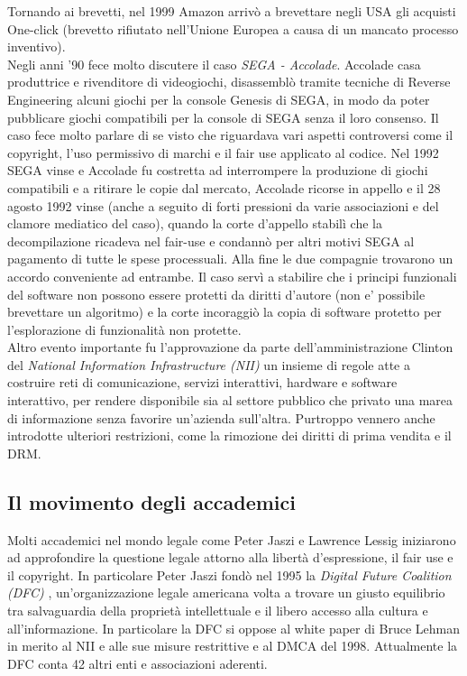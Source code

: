 Tornando ai brevetti, nel 1999 Amazon arrivò a brevettare negli USA gli acquisti One-click (brevetto rifiutato nell'Unione Europea a causa di un mancato processo inventivo).\\

Negli anni '90 fece molto discutere il caso \textit{SEGA - Accolade}. Accolade casa produttrice e rivenditore di videogiochi, disassemblò tramite tecniche di Reverse Engineering alcuni giochi per la console Genesis di SEGA, in modo da poter pubblicare giochi compatibili per la console di SEGA senza il loro consenso. Il caso fece molto parlare di se visto che riguardava vari aspetti controversi come il copyright, l'uso permissivo di marchi e il fair use applicato al codice.
Nel 1992 SEGA vinse e Accolade fu costretta ad interrompere la produzione di giochi compatibili e a ritirare le copie dal mercato, Accolade ricorse in appello e il 28 agosto 1992 vinse (anche a seguito di forti pressioni da varie associazioni e del clamore mediatico del caso), quando la corte d'appello stabilì che la decompilazione ricadeva nel fair-use e condannò per altri motivi SEGA al pagamento di tutte le spese processuali. Alla fine le due compagnie trovarono un accordo conveniente ad entrambe. Il caso servì a stabilire che i principi funzionali del software non possono essere protetti da diritti d'autore (non e' possibile brevettare un algoritmo) e la corte incoraggiò la copia di software protetto per l'esplorazione di funzionalità non protette.\\

Altro evento importante fu l'approvazione da parte dell'amministrazione Clinton del \textit{National Information Infrastructure (NII)} un insieme di regole atte a costruire reti di comunicazione, servizi interattivi, hardware e software interattivo, per rendere disponibile sia al settore pubblico che privato una marea di informazione senza favorire un'azienda sull'altra. Purtroppo vennero anche introdotte ulteriori restrizioni, come la rimozione dei diritti di prima vendita e il DRM.

\subsection{Il movimento degli accademici}

Molti accademici nel mondo legale come Peter Jaszi e Lawrence Lessig iniziarono ad approfondire la questione legale attorno alla libertà d'espressione, il fair use e il copyright. In particolare Peter Jaszi fondò nel 1995 la \textit{Digital Future Coalition (DFC)} , un'organizzazione legale americana volta a trovare un giusto equilibrio tra salvaguardia della proprietà intellettuale e il libero accesso alla cultura e all'informazione. In particolare la DFC si oppose al white paper di Bruce Lehman in merito al NII e alle sue misure restrittive e al DMCA del 1998. Attualmente la DFC conta 42 altri enti e associazioni aderenti.\\

